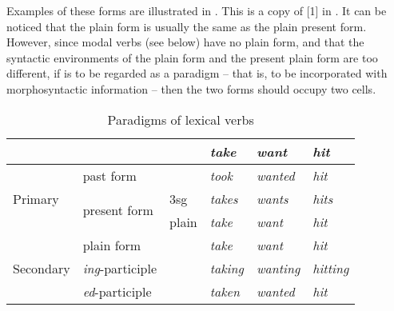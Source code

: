 \documentclass[UTF8, a4paper, oneside, scheme=plain]{ctexrep}
\newcommand*{\citesec}[1]{\S~{#1}}
\newcommand{\corpus}[1]{\emph{#1}}
\begin{document}
Examples of these forms are illustrated in . 
This is a copy of [1] in \citet[\citesec{1.1}]{cgel}.
It can be noticed that the plain form is usually the same as the plain present form.
However, since modal verbs (see below) have no plain form,
and that the syntactic environments of the plain form and the present plain form are too different,
if  is to be regarded as a paradigm
-- that is, to be incorporated with morphosyntactic information -- 
then the two forms should occupy two cells.

\begin{table}[H]
    \caption{Paradigms of lexical verbs}
    \label{tbl:lexical-inflection}
    \centering
    \begin{tabular}{@{}llllll@{}}
    \toprule
    \multicolumn{1}{l}{}       &                               &       & \corpus{take}   & \corpus{want}    & \corpus{hit}     \\ \midrule
    \multirow{3}{*}{Primary}   & past form                     &       & \corpus{took}   & \corpus{wanted}  & \corpus{hit}     \\
                               & \multirow{2}{*}{present form} & 3sg   & \corpus{takes}  & \corpus{wants}   & \corpus{hits}    \\
                               &                               & plain & \corpus{take}   & \corpus{want}    & \corpus{hit}     \\ \midrule
    \multirow{3}{*}{Secondary} & plain form                    &       & \corpus{take}   & \corpus{want}    & \corpus{hit}     \\
                               & \corpus{ing}-participle       &       & \corpus{taking} & \corpus{wanting} & \corpus{hitting} \\
                               & \corpus{ed}-participle        &       & \corpus{taken}  & \corpus{wanted}  & \corpus{hit}     \\ \bottomrule
    \end{tabular}
\end{table}
\end{document}
